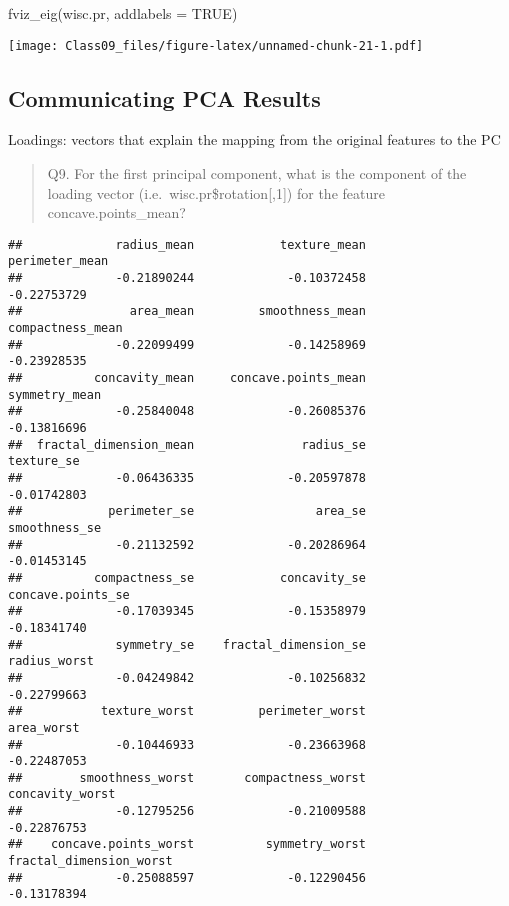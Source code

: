 \documentclass[
]{article}
\newenvironment{Shaded}{\begin{snugshade}}{\end{snugshade}}
\newcommand{\AttributeTok}[1]{\textcolor[rgb]{0.77,0.63,0.00}{#1}}
\newcommand{\ConstantTok}[1]{\textcolor[rgb]{0.00,0.00,0.00}{#1}}
\newcommand{\DecValTok}[1]{\textcolor[rgb]{0.00,0.00,0.81}{#1}}
\newcommand{\FunctionTok}[1]{\textcolor[rgb]{0.00,0.00,0.00}{#1}}
\newcommand{\NormalTok}[1]{#1}
\newcommand{\SpecialCharTok}[1]{\textcolor[rgb]{0.00,0.00,0.00}{#1}}
\begin{document}
\begin{Shaded}
\begin{Highlighting}[]
\FunctionTok{fviz\_eig}\NormalTok{(wisc.pr, }\AttributeTok{addlabels =} \ConstantTok{TRUE}\NormalTok{)}
\end{Highlighting}
\end{Shaded}

\texttt{[image: Class09\_files/figure-latex/unnamed-chunk-21-1.pdf]}

\hypertarget{communicating-pca-results}{%
\subsection{Communicating PCA Results}\label{communicating-pca-results}}

Loadings: vectors that explain the mapping from the original features to
the PC

\begin{quote}
Q9. For the first principal component, what is the component of the
loading vector (i.e.~wisc.pr\$rotation{[},1{]}) for the feature
concave.points\_mean?
\end{quote}

\begin{Shaded}
\end{Shaded}

\begin{verbatim}
##             radius_mean            texture_mean          perimeter_mean 
##             -0.21890244             -0.10372458             -0.22753729 
##               area_mean         smoothness_mean        compactness_mean 
##             -0.22099499             -0.14258969             -0.23928535 
##          concavity_mean     concave.points_mean           symmetry_mean 
##             -0.25840048             -0.26085376             -0.13816696 
##  fractal_dimension_mean               radius_se              texture_se 
##             -0.06436335             -0.20597878             -0.01742803 
##            perimeter_se                 area_se           smoothness_se 
##             -0.21132592             -0.20286964             -0.01453145 
##          compactness_se            concavity_se       concave.points_se 
##             -0.17039345             -0.15358979             -0.18341740 
##             symmetry_se    fractal_dimension_se            radius_worst 
##             -0.04249842             -0.10256832             -0.22799663 
##           texture_worst         perimeter_worst              area_worst 
##             -0.10446933             -0.23663968             -0.22487053 
##        smoothness_worst       compactness_worst         concavity_worst 
##             -0.12795256             -0.21009588             -0.22876753 
##    concave.points_worst          symmetry_worst fractal_dimension_worst 
##             -0.25088597             -0.12290456             -0.13178394
\end{verbatim}
\end{document}

